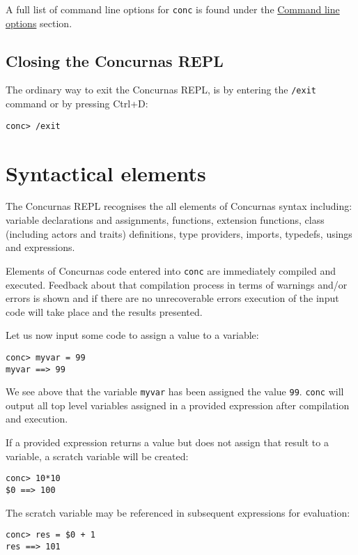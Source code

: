 \documentclass[conc-doc]{subfiles}
\begin{document}
A full list of command line options for \lstinline[language=None]{conc} is found under the \hyperref[sec:cmdlineparams]{Command line options} section.

\subsection{Closing the Concurnas REPL}
The ordinary way to exit the Concurnas REPL, is by entering the \lstinline[language=None]{/exit} command or by pressing Ctrl+D:

\begin{lstlisting}[language=None]
conc> /exit
\end{lstlisting}


\section{Syntactical elements}
The Concurnas REPL recognises the all elements of Concurnas syntax including: variable declarations and assignments, functions, extension functions, class (including actors and traits) definitions, type providers, imports, typedefs, usings and expressions.

Elements of Concurnas code entered into \lstinline[language=None]{conc} are immediately compiled and executed. Feedback about that compilation process in terms of warnings and/or errors is shown and if there are no unrecoverable errors execution of the input code will take place and the results presented.
	
Let us now input some code to assign a value to a variable:

\begin{lstlisting}[language=None]
conc> myvar = 99
myvar ==> 99
\end{lstlisting}

We see above that the variable \lstinline[language=None]{myvar} has been assigned the value \lstinline[language=None]{99}. \lstinline[language=None]{conc} will output all top level variables assigned in a provided expression after compilation and execution.

If a provided expression returns a value but does not assign that result to a variable, a scratch variable will be created:

\begin{lstlisting}[language=None]
conc> 10*10
$0 ==> 100
\end{lstlisting}

The scratch variable may be referenced in subsequent expressions for evaluation:
\begin{lstlisting}[language=None]
conc> res = $0 + 1
res ==> 101
\end{lstlisting}
\end{document}
